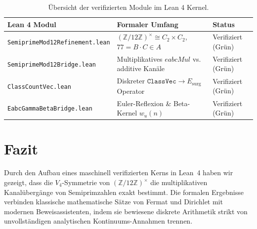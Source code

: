 \documentclass[11pt,a4paper]{article}
\theoremstyle{definition}
\begin{document}
	\begin{table}[h]
		\centering
		\small
		\begin{tabular}{lll}
			\toprule
			\textbf{Lean 4 Modul} & \textbf{Formaler Umfang} & \textbf{Status} \\
			\midrule
			\texttt{SemiprimeMod12Refinement.lean} & $(\mathbb{Z}/12\mathbb{Z})^\times \cong C_2 \times C_2$, $77 = B \cdot C \in A$ & Verifiziert (Grün) \\
			\texttt{SemiprimeMod12Bridge.lean} & Multiplikatives $eabcMul$ vs. additive Kanäle & Verifiziert (Grün) \\
			\texttt{ClassCountVec.lean} & Diskreter $\mathtt{ClassVec} \to E_{\mathrm{surg}}$ Operator & Verifiziert (Grün) \\
			\texttt{EabcGammaBetaBridge.lean} & Euler-Reflexion \& Beta-Kernel $w_u(n)$ & Verifiziert (Grün) \\
			\bottomrule
		\end{tabular}
		\caption{Übersicht der verifizierten Module im Lean 4 Kernel.}
	\end{table}
	
	\section{Fazit}
	
	Durch den Aufbau eines maschinell verifizierten Kerns in Lean~4 haben wir gezeigt, dass die $V_4$-Symmetrie von $(\mathbb{Z}/12\mathbb{Z})^\times$ die multiplikativen Kanalübergänge von Semiprimzahlen exakt bestimmt. Die formalen Ergebnisse verbinden klassische mathematische Sätze von Fermat und Dirichlet mit modernen Beweisassistenten, indem sie bewiesene diskrete Arithmetik strikt von unvollständigen analytischen Kontinuums-Annahmen trennen.
	
\end{document}
